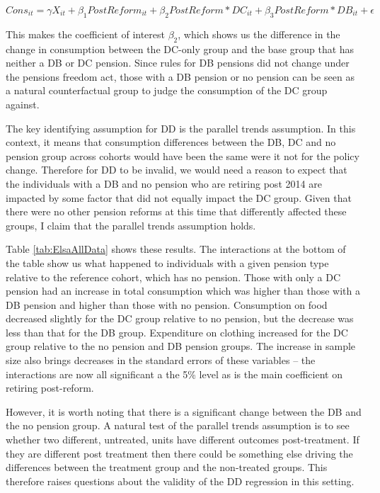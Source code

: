 \documentclass[12pt]{article}
\begin{document}
\begin{equation*}
    Cons_{it} =  \gamma X_{it} + \beta_{1} PostReform_{it} + \beta_{2} PostReform*DC_{it} + \beta_{3} PostReform*DB_{it}  + \epsilon
\end{equation*}


This makes the coefficient of interest $\beta_{2}$, which shows us the
difference in the change in consumption between the DC-only group and the base
group that has neither a DB or DC pension. Since rules for DB pensions did not
change under the pensions freedom act, those with a DB pension or no pension can
be seen as a natural counterfactual group to judge the consumption of the DC
group against.

The key identifying assumption for DD is the parallel trends assumption. In this
context, it means that consumption differences between the DB, DC and no pension
group across cohorts would have been the same were it not for the policy change.
Therefore for DD to be invalid, we would need a reason to expect that the
individuals with a DB and no pension who are retiring post 2014 are impacted by
some factor that did not equally impact the DC group. Given that there were no
other pension reforms at this time that differently affected these groups, I
claim that the parallel trends assumption holds.

Table \ref{tab:ElsaAllData} shows these results. The interactions at the bottom
of the table show us what happened to individuals with a given pension type
relative to the reference cohort, which has no pension. Those with only a DC
pension had an increase in total consumption which was higher than those with a
DB pension and higher than those with no pension. Consumption on food decreased
slightly for the DC group relative to no pension, but the decrease was less than
that for the DB group. Expenditure on clothing increased for the DC group
relative to the no pension and DB pension groups. The increase in sample size
also brings decreases in the standard errors of these variables -- the
interactions are now all significant a the 5\% level as is the main coefficient
on retiring post-reform.

However, it is worth noting that there is a significant change between the DB
and the no pension group. A natural test of the parallel trends assumption is to
see whether two different, untreated, units have different outcomes
post-treatment. If they are different post treatment then there could be
something else driving the differences between the treatment group and the
non-treated groups. This therefore raises questions about the validity of the DD
regression in this setting.
\end{document}
